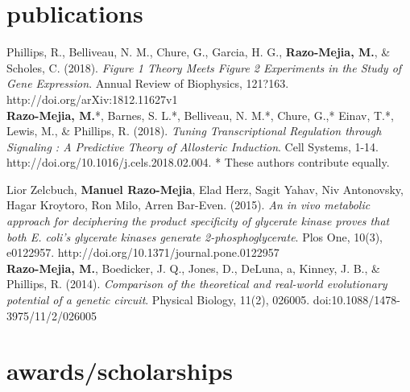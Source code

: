 \documentclass[]{friggeri-cv}
\begin{document}
\section{publications}

Phillips, R., Belliveau, N. M., Chure, G., Garcia, H. G., \textbf{Razo-Mejia, M.}, \& Scholes, C. (2018). \textit{Figure 1 Theory Meets Figure 2 Experiments in the Study of Gene Expression}. Annual Review of Biophysics, 121?163. http://doi.org/arXiv:1812.11627v1\\

\textbf{Razo-Mejia, M.}*, Barnes, S. L.*, Belliveau, N. M.*, Chure, G.,* Einav, T.*, Lewis, M., \& Phillips, R. (2018). \textit{Tuning Transcriptional Regulation through Signaling : A Predictive Theory of Allosteric Induction}. Cell Systems, 1-14. http://doi.org/10.1016/j.cels.2018.02.004. * These authors contribute equally.

Lior Zelcbuch, \textbf{Manuel Razo-Mejia}, Elad Herz, Sagit Yahav, Niv Antonovsky, Hagar Kroytoro, Ron Milo, Arren Bar-Even. (2015). \textit{An in vivo metabolic approach for deciphering the product specificity of glycerate kinase proves that both E. coli's glycerate kinases generate 2-phosphoglycerate}. Plos One, 10(3), e0122957. http://doi.org/10.1371/journal.pone.0122957\\

\textbf{Razo-Mejia, M.}, Boedicker, J. Q., Jones, D., DeLuna, a, Kinney, J. B., \& Phillips, R. (2014). \textit{Comparison of the theoretical and real-world evolutionary potential of a genetic circuit}. Physical Biology, 11(2), 026005. doi:10.1088/1478-3975/11/2/026005\\

\section{awards/scholarships}
\end{document}
